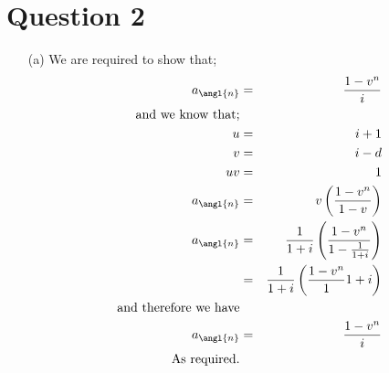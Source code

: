 \documentclass[12pt,a4paper]{article}
\begin{document}
\section*{Question 2}
\begin{enumerate}
\item[(a)] We are required to show that;
\begin{eqnarray*}
a_{\angl{n}}& =&\frac{1-v^n}{i}\\
\text{and we know that;}\\
u& =&i+1\\
v&=&i-d\\
uv&=&1\\
a_{\angl{n}}& =&v\left(\frac{1-v^n}{1-v}\right)\\
a_{\angl{n}}& =&\frac{1}{1+i}\left(  \frac{1-v^n}{1-\frac{1}{1+i}}\right)\\
&=&\frac{1}{1+i} \left(   \frac{1-v^n}{1} 1+i\right)\\
\text{ and therefore we have}\\
a_{\angl{n}}& =&\frac{1-v^n}{i}\\
\text{As required.}
\end{eqnarray*}


\end{enumerate}
\end{document}
